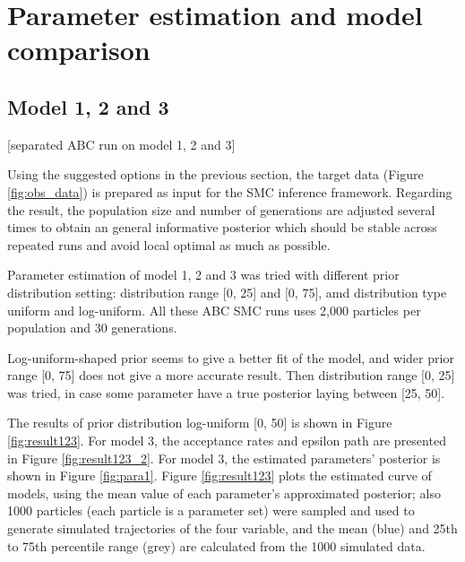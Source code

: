 







\section{Parameter estimation and model comparison}

\subsection{Model 1, 2 and 3}

[separated ABC run on model 1, 2 and 3]

Using the suggested options in the previous section, the target data (Figure \ref{fig:obs_data}) is prepared as input for the SMC inference framework. Regarding the result, the population size and number of generations are adjusted several times to obtain an general informative posterior which should be stable across repeated runs and avoid local optimal as much as possible.

Parameter estimation of model 1, 2 and 3 was tried with different prior distribution setting: distribution range [0, 25] and [0, 75], amd distribution type uniform and log-uniform. All these ABC SMC runs uses 2,000 particles per population and 30 generations.

Log-uniform-shaped prior seems to give a better fit of the model, and wider prior range [0, 75] does not give a more accurate result. Then distribution range [0, 25] was tried, in case some parameter have a true posterior laying between [25, 50].

The results of prior distribution log-uniform [0, 50] is shown in Figure \ref{fig:result123}. For model 3, the acceptance rates and epsilon path are presented in Figure \ref{fig:result123_2}. For model 3, the estimated parameters' posterior is shown in Figure \ref{fig:para1}. Figure \ref{fig:result123} plots the estimated curve of models, using the mean value of each parameter's approximated posterior; also 1000 particles (each particle is a parameter set) were sampled and used to generate simulated trajectories of the four variable, and the mean (blue) and 25th to 75th percentile range (grey) are calculated from the 1000 simulated data.

